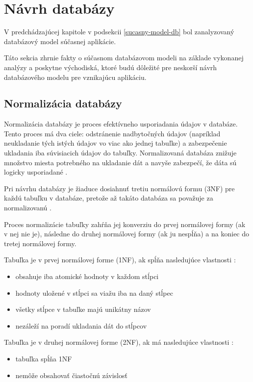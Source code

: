 \section{Návrh databázy}
V predchádzajúcej kapitole v podsekcii \ref{sucasny-model-db} bol zanalyzovaný databázový model súčasnej aplikácie.

Táto sekcia zhrnie fakty o súčasnom databázovom modeli na základe vykonanej analýzy a poskytne východiská, ktoré budú dôležité pre neskorší návrh databázového modelu pre vznikajúcu aplikáciu.

\subsection{Normalizácia databázy}
Normalizácia databázy je proces efektívneho usporiadania údajov v databáze. Tento proces má dva ciele: odstránenie nadbytočných údajov (napríklad neukladanie tých istých údajov vo viac ako jednej tabuľke) a zabezpečenie ukladania iba  súvisiacich údajov do tabuľky. Normalizovaná databáza znižuje množstvo miesta potrebného na ukladanie dát a navyše zabezpečí, že dáta sú logicky usporiadané \cite{co-je-normalizacia}.

Pri návrhu databázy je žiaduce dosiahnuť tretiu normálovú formu (3NF) pre každú tabuľku v databáze, pretože až takáto databáza sa považuje za normalizovanú \cite{normalizovana-tabulka}.

Proces normalizácie tabuľky zahŕňa jej konverziu do prvej normálovej formy (ak v nej nie je), následne do druhej normálovej formy (ak ju nespĺňa) a na koniec do tretej normálovej formy.

Tabuľka je v prvej normálovej forme (1NF), ak spĺňa nasledujúce vlastnosti \cite{typy-normalizacie}:
\begin{itemize}
	\item obsahuje iba atomické hodnoty v každom stĺpci
	\item hodnoty uložené v stĺpci sa viažu iba na daný stĺpec
	\item všetky stĺpce v tabuľke majú unikátny názov
	\item nezáleží na poradí ukladania dát do stĺpcov 
\end{itemize}

Tabuľka je v druhej normálovej forme (2NF), ak má nasledujúce vlastnosti \cite{typy-normalizacie}:
\begin{itemize}
	\item tabuľka spĺňa 1NF
	\item nemôže obsahovať čiastočnú závislosť
\end{itemize}


